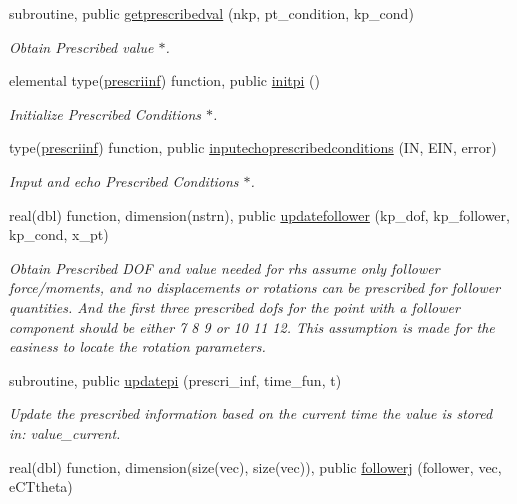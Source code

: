 \begin{DoxyCompactItemize}
subroutine, public \hyperlink{namespaceprescribedcondition_aca74e9a71af6abd13879e147076e89ef}{getprescribedval} (nkp, pt\+\_\+condition, kp\+\_\+cond)
\begin{DoxyCompactList}\small\item\em Obtain Prescribed value $\ast$. \end{DoxyCompactList}\item 
elemental type(\hyperlink{structprescribedcondition_1_1prescriinf}{prescriinf}) function, public \hyperlink{namespaceprescribedcondition_ae3bccf07eaf4452047a11ce8dcb3e554}{initpi} ()
\begin{DoxyCompactList}\small\item\em Initialize Prescribed Conditions $\ast$. \end{DoxyCompactList}\item 
type(\hyperlink{structprescribedcondition_1_1prescriinf}{prescriinf}) function, public \hyperlink{namespaceprescribedcondition_a66d378b405e124a0d9a7ad04e262109b}{inputechoprescribedconditions} (IN, E\+IN, error)
\begin{DoxyCompactList}\small\item\em Input and echo Prescribed Conditions $\ast$. \end{DoxyCompactList}\item 
real(dbl) function, dimension(nstrn), public \hyperlink{namespaceprescribedcondition_a58a4332d8bb0ceb882aa3229085dce34}{updatefollower} (kp\+\_\+dof, kp\+\_\+follower, kp\+\_\+cond, x\+\_\+pt)
\begin{DoxyCompactList}\small\item\em Obtain Prescribed D\+OF and value needed for rhs assume only follower force/moments, and no displacements or rotations can be prescribed for follower quantities. And the first three prescribed dofs for the point with a follower component should be either 7 8 9 or 10 11 12. This assumption is made for the easiness to locate the rotation parameters. \end{DoxyCompactList}\item 
subroutine, public \hyperlink{namespaceprescribedcondition_a270714d4f42553a8f966674392dedbfe}{updatepi} (prescri\+\_\+inf, time\+\_\+fun, t)
\begin{DoxyCompactList}\small\item\em Update the prescribed information based on the current time the value is stored in\+: value\+\_\+current. \end{DoxyCompactList}\item 
real(dbl) function, dimension(size(vec), size(vec)), public \hyperlink{namespaceprescribedcondition_a4c109cd4a8df6fedff99e15f448cf944}{followerj} (follower, vec, e\+C\+Ttheta)

\end{DoxyCompactItemize}
